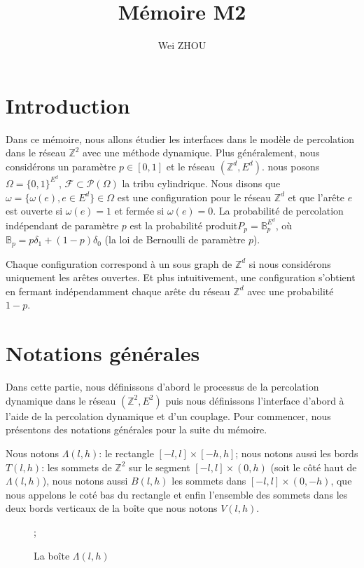 \documentclass[titlepage,a4paper,12pt]{article}
\title{Mémoire M2}
\author{Wei ZHOU}
\newcounter{cor}
\begin{document}
\maketitle

\section{Introduction}
Dans ce mémoire, nous allons étudier les interfaces dans le modèle de percolation dans le réseau $\mathbb{Z}^2$ avec une méthode dynamique. Plus généralement, nous considérons un paramètre $p\in [0,1]$ et le réseau $(\mathbb{Z}^d,E^d)$. nous posons $\Omega = \{0,1\}^{E^d}$, $\mathcal{F}\subset \mathcal{P}(\Omega)$ la tribu cylindrique. Nous disons que $\omega = \{\omega(e), e\in E^d\} \in \Omega$ est une configuration pour le réseau $\mathbb{Z}^d$ et que l'arête $e$ est ouverte si $\omega(e) = 1$ et fermée si $\omega(e)= 0$. La probabilité de percolation indépendant de paramètre $p$ est la probabilité produit$P_p = \mathbb{B}_p^{E^d}$, où $\mathbb{B}_p = p\delta_1 +(1-p)\delta_0 $ (la loi de Bernoulli de paramètre $p$).

Chaque configuration correspond à un sous graph de $\mathbb{Z}^d$ si nous considérons uniquement les arêtes ouvertes. Et plus intuitivement, une configuration s'obtient en fermant indépendamment chaque arête du réseau $\mathbb{Z}^d$ avec une probabilité $1-p$. 

\section{Notations générales}
Dans cette partie, nous définissons d'abord le processus de la percolation dynamique dans le réseau $(\mathbb{Z}^2,E^2)$ puis nous définissons l'interface d'abord à l'aide de la percolation dynamique et d'un couplage. Pour commencer, nous présentons des notations générales pour la suite du mémoire.

Nous notons $\Lambda(l,h)$: le rectangle $[-l,l]\times[-h,h]$;  nous notons aussi les bords $T(l,h)$: les sommets de $\mathbb{Z}^2$ sur le segment $[-l,l]\times(0,h)$ (soit le côté haut de $\Lambda(l,h)$), nous notons aussi $B(l,h)$ les sommets dans $[-l,l]\times(0,-h)$, que nous appelons le coté bas du rectangle et enfin l'ensemble des sommets dans les deux bords verticaux de la boîte que nous notons $V(l,h)$.
\begin{figure}[h]
\center
{}
\caption{La boîte $\Lambda(l,h)$};
\end{figure}
\end{document}
